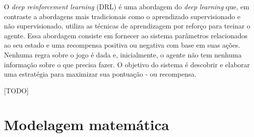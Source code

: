  O \textit{deep reinforcement learning} (DRL) é uma abordagem do \textit{deep learning} que, em contraste a abordagens mais tradicionais como o aprendizado supervisionado e não supervisionado, utiliza as técnicas de aprendizagem por reforço para treinar o agente. Essa abordagem consiste em fornecer ao sistema parâmetros relacionados ao seu estado e uma recompensa positiva ou negativa com base em suas ações. Nenhuma regra sobre o jogo é dada e, inicialmente, o agente não tem nenhuma informação sobre o que precisa fazer. O objetivo do sistema é descobrir e elaborar uma estratégia para maximizar sua pontuação - ou recompensa.


 [TODO]


 \section{Modelagem matemática} %
 \label{sec:modelagem_matemática}
 




